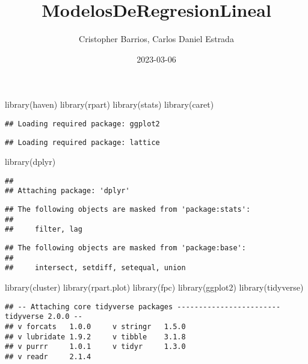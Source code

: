 \documentclass[
]{article}
\title{ModelosDeRegresionLineal}
\author{Cristopher Barrios, Carlos Daniel Estrada}
\date{2023-03-06}
\newenvironment{Shaded}{\begin{snugshade}}{\end{snugshade}}
\newcommand{\FunctionTok}[1]{\textcolor[rgb]{0.00,0.00,0.00}{#1}}
\newcommand{\NormalTok}[1]{#1}
\begin{document}
\maketitle

\begin{Shaded}
\begin{Highlighting}[]
\FunctionTok{library}\NormalTok{(haven)}
\FunctionTok{library}\NormalTok{(rpart)}
\FunctionTok{library}\NormalTok{(stats)}
\FunctionTok{library}\NormalTok{(caret)}
\end{Highlighting}
\end{Shaded}

\begin{verbatim}
## Loading required package: ggplot2
\end{verbatim}

\begin{verbatim}
## Loading required package: lattice
\end{verbatim}

\begin{Shaded}
\begin{Highlighting}[]
\FunctionTok{library}\NormalTok{(dplyr)}
\end{Highlighting}
\end{Shaded}

\begin{verbatim}
## 
## Attaching package: 'dplyr'
\end{verbatim}

\begin{verbatim}
## The following objects are masked from 'package:stats':
## 
##     filter, lag
\end{verbatim}

\begin{verbatim}
## The following objects are masked from 'package:base':
## 
##     intersect, setdiff, setequal, union
\end{verbatim}

\begin{Shaded}
\begin{Highlighting}[]
\FunctionTok{library}\NormalTok{(cluster)}
\FunctionTok{library}\NormalTok{(rpart.plot)}
\FunctionTok{library}\NormalTok{(fpc)}
\FunctionTok{library}\NormalTok{(ggplot2)}
\FunctionTok{library}\NormalTok{(tidyverse)}
\end{Highlighting}
\end{Shaded}

\begin{verbatim}
## -- Attaching core tidyverse packages ------------------------ tidyverse 2.0.0 --
## v forcats   1.0.0     v stringr   1.5.0
## v lubridate 1.9.2     v tibble    3.1.8
## v purrr     1.0.1     v tidyr     1.3.0
## v readr     2.1.4
\end{verbatim}
\end{document}
